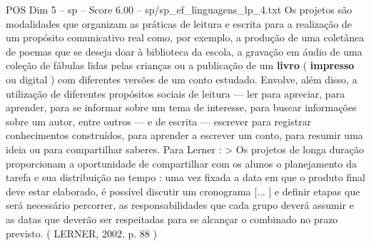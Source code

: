 \begin{textsample}{POS Dim 5 – sp – Score 6.00 – sp/sp\_ef\_linguagens\_lp\_4.txt}
Os projetos são modalidades que organizam as práticas de leitura e escrita para a realização de um propósito comunicativo real como, por exemplo, a produção de uma coletânea de poemas que se deseja doar à biblioteca da escola, a gravação em áudio de uma coleção de fábulas lidas pelas crianças ou a publicação de um \textbf{livro} ( \textbf{impresso} ou digital ) com diferentes versões de um conto estudado.
Envolve, além disso, a utilização de diferentes propósitos sociais de leitura — ler para apreciar, para aprender, para se informar sobre um tema de interesse, para buscar informações sobre um autor, entre outros — e de escrita — escrever para registrar conhecimentos construídos, para aprender a escrever um conto, para resumir uma ideia ou para compartilhar saberes.
Para Lerner : > Os projetos de longa duração proporcionam a oportunidade de compartilhar com os alunos o planejamento da tarefa e sua distribuição no tempo : uma vez fixada a data em que o produto final deve estar elaborado, é possível discutir um cronograma [... ] e definir etapas que será necessário percorrer, as responsabilidades que cada grupo deverá assumir e as datas que deverão ser respeitadas para se alcançar o combinado no prazo previsto. ( LERNER, 2002, p. 88 )

\end{textsample}
